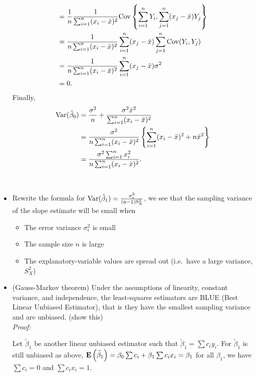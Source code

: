 \begin{itemize}
\begin{pf}
$$\begin{aligned}
 &= \frac{1}{n} \frac{ 1 }{ \sum_{i = 1}^n(x_i - \bar{x})^2 }
    {\rm Cov} \left\{ \sum_{i = 1}^n Y_i, \sum_{j = 1}^n(x_j - \bar{x})Y_j \right\} \\
 &= \frac{ 1 }{ n \sum_{i = 1}^n(x_i - \bar{x})^2 }
    \sum_{i = 1}^n (x_j - \bar{x}) \sum_{j = 1}^n {\rm Cov}(Y_i, Y_j) \\
 &= \frac{ 1 }{ n \sum_{i = 1}^n(x_i - \bar{x})^2 }
    \sum_{i = 1}^n (x_j - \bar{x}) \sigma^2 \\
 &= 0.
\end{aligned}    
    $$
    Finally, 
    $$
\begin{aligned}
{\rm Var}(\hat{\beta}_0)
 &= \frac{\sigma^2}{n} + \frac{ \sigma^2 \bar{x}^2}{ \sum_{i = 1}^n(x_i - \bar{x})^2  } \\
 &= \frac{\sigma^2 }{ n \sum_{i = 1}^n(x_i - \bar{x})^2 }
    \left\{ \sum_{i = 1}^n(x_i - \bar{x})^2 + n \bar{x}^2 \right\} \\
 &= \frac{\sigma^2 \sum_{i = 1}^n x_i^2}{ n \sum_{i = 1}^n(x_i - \bar{x})^2 }.
\end{aligned}    
    $$
\end{pf}
  \\
  \item  Rewrite the formula for $  \rm Var(\hat{\beta}_1) = \frac{\sigma_\epsilon^2}{(n - 1)S_X^2}$, we see that the sampling variance of the slope estimate will be small when
  \begin{itemize}
    \item The error variance $\sigma_\epsilon^2$ is small
    \item The sample size $n$ is large
    \item The explanatory-variable values are spread out (i.e.~have a large variance, $S_X^2$)
  \end{itemize}
  \item (Gauss-Markov theorem) Under the assumptions of linearity, constant variance, and independence, the least-squares estimators are BLUE (Best Linear Unbiased Estimator), that is they have the smallest sampling variance and are unbiased. (show this)\\
  {\it Proof:}\\
  \begin{pf}
  Let $\widetilde{\beta}_1$ be another linear unbiased estimator such that $\widetilde{\beta}_1 = \sum c_i y_i$.  For $\widetilde{\beta}_1$ is still unbiased as above, ${\mathbf{E}\left(\widetilde{\beta}_1\right)} = \beta_0 \sum c_i + \beta_1 \sum c_i x_i = \beta_1$ for all $\beta_1$,
  we have $\sum c_i = 0$ and $\sum c_i x_i = 1$.\\

\end{pf}
\end{itemize}
